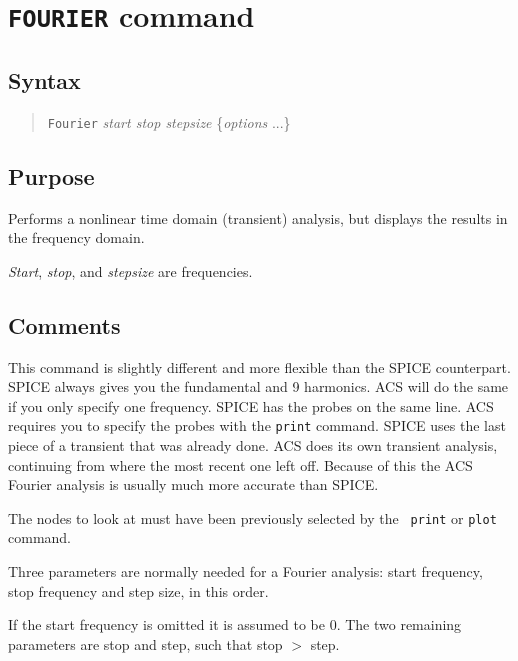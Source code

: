 \section{{\tt FOURIER} command}
\subsection{Syntax}
\begin{verse}
{\tt Fourier} {\it start stop stepsize} \{{\it options} ...\}
\end{verse}
\subsection{Purpose}

Performs a nonlinear time domain (transient) analysis, but displays the
results in the frequency domain.

{\it Start}, {\it stop}, and {\it stepsize} are frequencies.
\subsection{Comments}

This command is slightly different and more flexible than the SPICE
counterpart.  SPICE always gives you the fundamental and 9 harmonics.
ACS will do the same if you only specify one frequency.  SPICE has
the probes on the same line.  ACS requires you to specify the probes
with the {\tt print} command.  SPICE uses the last piece of a
transient that was already done.  ACS does its own transient
analysis, continuing from where the most recent one left off.
Because of this the ACS Fourier analysis is usually much more
accurate than SPICE.

The nodes to look at must have been previously selected by the {\tt
print} or {\tt plot} command.

Three parameters are normally needed for a Fourier analysis: start
frequency, stop frequency and step size, in this order.

If the start frequency is omitted it is assumed to be 0.  The two
remaining parameters are stop and step, such that stop $>$ step.

